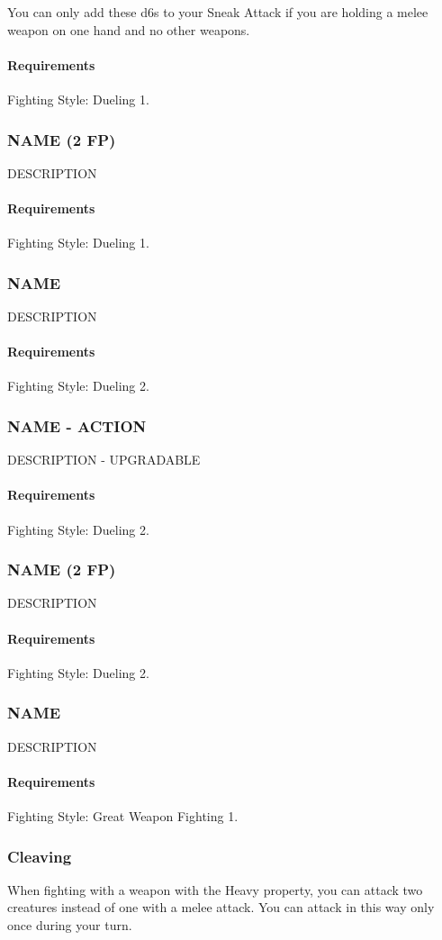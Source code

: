     You can only add these d6s to your Sneak Attack if you are holding a melee weapon on one hand and no other weapons.
    \paragraph{Requirements} Fighting Style: Dueling 1.
\subsubsection{NAME (2 FP)} \label{feat::name}
    DESCRIPTION
    \paragraph{Requirements} Fighting Style: Dueling 1.
\subsubsection{NAME} \label{feat::name}
    DESCRIPTION
    \paragraph{Requirements} Fighting Style: Dueling 2.
\subsubsection{NAME - ACTION} \label{feat::name}
    DESCRIPTION - UPGRADABLE
    \paragraph{Requirements} Fighting Style: Dueling 2.
\subsubsection{NAME (2 FP)} \label{feat::name}
    DESCRIPTION
    \paragraph{Requirements} Fighting Style: Dueling 2.
\subsubsection{NAME} \label{feat::name}
    DESCRIPTION
    \paragraph{Requirements} Fighting Style: Great Weapon Fighting 1.
\subsubsection{Cleaving} \label{feat::cleaving}
    When fighting with a weapon with the Heavy property, you can attack two creatures instead of one with a melee attack.
    You can attack in this way only once during your turn.

